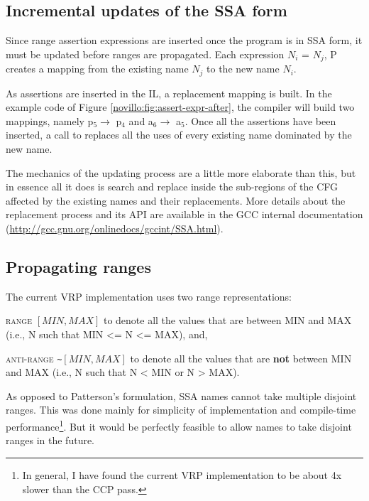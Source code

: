 \subsection{Incremental updates of the SSA form}

Since range assertion expressions are inserted once the program
is in SSA form, it must be updated before ranges are propagated.
Each expression $N_i$ = $N_j$, P\lcode{>}
creates a mapping from the existing name $N_j$ to the new name
$N_i$.

As assertions are inserted in the IL, a replacement mapping is
built.  In the example code of Figure
\ref{novillo:fig:assert-expr-after}, the compiler will build two
mappings, namely p$_5 \rightarrow$ p$_4$ and a$_6 \rightarrow$
a$_5$.  Once all the assertions have been inserted, a call to
 replaces all the uses of every existing name
dominated by the new name.

The mechanics of the updating process are a little more
elaborate than this, but in essence all it does is search and
replace inside the sub-regions of the CFG affected by the
existing names and their replacements.  More details about the
replacement process and its API are available in the GCC internal
documentation (\url{http://gcc.gnu.org/onlinedocs/gccint/SSA.html}).

\subsection{Propagating ranges}

The current VRP implementation uses two range representations:

\begin{description}
\item	\textsc{range} $[MIN, MAX]$ to denote all the values that
	are between MIN and MAX (i.e., N such that MIN <= N <=
	MAX), and,

\item	\textsc{anti-range} \verb"~"$[MIN, MAX]$ to denote all
	the values that are \textbf{not} between MIN and MAX
	(i.e., N such that N < MIN or N > MAX).
\end{description}

As opposed to Patterson's formulation, SSA names cannot take
multiple disjoint ranges.  This was done mainly for simplicity of
implementation and compile-time performance\footnote{In general,
I have found the current VRP implementation to be about 4x slower
than the CCP pass.}.  But it would be perfectly feasible to allow
names to take disjoint ranges in the future.

